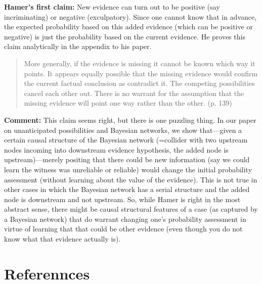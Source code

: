 \documentclass[
  10pt,
  dvipsnames,enabledeprecatedfontcommands]{scrartcl}
\begin{document}
\textbf{Hamer's first claim:} New evidence can turn out to be positive
(say incriminating) or negative (exculpatory). Since one cannot know
that in advance, the expected probability based on this added evidence
(which can be positive or negative) is just the probability based on the
current evidence. He proves this claim analytically in the appendix to
his paper.

\begin{quote}
More generally, if the evidence is missing it cannot be known which way it points.
It appears equally possible that the missing evidence would confirm the current factual conclusion as
contradict it. The competing possibilities cancel each other out. There is no warrant for the assumption
that the missing evidence will point one way rather than the other. (p. 139)
\end{quote}

\textbf{Comment:} This claim seems right, but there is one puzzling
thing. In our paper on unanticipated possibilities and Bayesian
networks, we show that---given a certain causal structure of the
Bayesian network (=collider with two upstream nodes incoming into
downstream evidence hypothesis, the added node is upstream)---merely
positing that there could be new information (say we could learn the
witness was unreliable or reliable) would change the initial probability
assessment (without learning about the value of the evidence). This is
not true in other cases in which the Bayesian network has a serial
structure and the added node is downstream and not upstream. So, while
Hamer is right in the most abstract sense, there might be causal
structural features of a case (as captured by a Bayesian network) that
do warrant changing one's probability assessment in virtue of learning
that that could be other evidence (even though you do not know what that
evidence actually is).

\hypertarget{referennces}{%
\section{Referennces}\label{referennces}}
\end{document}
